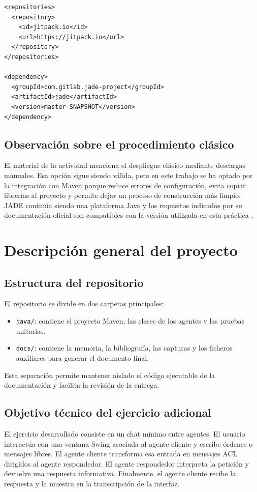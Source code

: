 \documentclass[12pt]{article}
\begin{document}
\begin{lstlisting}[style=javaStyle, caption={Configuración esencial del proyecto Maven para usar JADE.}]
<repositories>
  <repository>
    <id>jitpack.io</id>
    <url>https://jitpack.io</url>
  </repository>
</repositories>

<dependency>
  <groupId>com.gitlab.jade-project</groupId>
  <artifactId>jade</artifactId>
  <version>master-SNAPSHOT</version>
</dependency>
\end{lstlisting}

\subsection{Observación sobre el procedimiento clásico}
El material de la actividad menciona el despliegue clásico mediante descargas manuales. Esa opción sigue siendo válida, pero en este trabajo se ha optado por la integración con Maven porque reduce errores de configuración, evita copiar librerías al proyecto y permite dejar un proceso de construcción más limpio. JADE continúa siendo una plataforma Java y los requisitos indicados por su documentación oficial son compatibles con la versión utilizada en esta práctica \cite{jade-start,jade-about}.

\section{Descripción general del proyecto}
\subsection{Estructura del repositorio}
El repositorio se divide en dos carpetas principales:

\begin{itemize}[leftmargin=*]
  \item \texttt{java/}: contiene el proyecto Maven, las clases de los agentes y las pruebas unitarias.
  \item \texttt{docs/}: contiene la memoria, la bibliografía, las capturas y los ficheros auxiliares para generar el documento final.
\end{itemize}

Esta separación permite mantener aislado el código ejecutable de la documentación y facilita la revisión de la entrega.

\subsection{Objetivo técnico del ejercicio adicional}
El ejercicio desarrollado consiste en un chat mínimo entre agentes. El usuario interactúa con una ventana Swing asociada al agente cliente y escribe órdenes o mensajes libres. El agente cliente transforma esa entrada en mensajes ACL dirigidos al agente respondedor. El agente respondedor interpreta la petición y devuelve una respuesta informativa. Finalmente, el agente cliente recibe la respuesta y la muestra en la transcripción de la interfaz.
\end{document}
